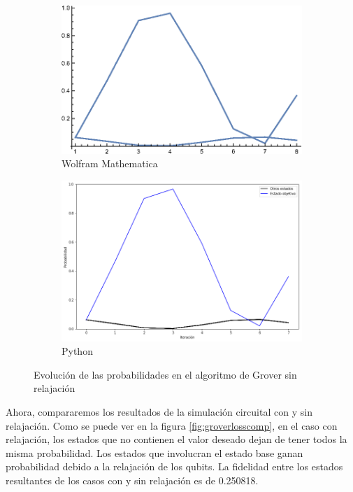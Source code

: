 \begin{figure}[H]
    \centering
    \begin{subfigure}[m]{0.49\textwidth}
        \centering
        \includegraphics[width=0.9\linewidth]{img/Grover-2_gr1.eps}
        \caption{Wolfram Mathematica}
    \end{subfigure}
    \begin{subfigure}[m]{0.49\textwidth}
        \centering
        \includegraphics[width=0.9\linewidth]{img/groveralllossless.png}
        \caption{Python}
    \end{subfigure}
    \caption[Evolución de las probabilidades en el algoritmo de Grover sin relajación]{Evolución de las probabilidades en el algoritmo de Grover sin relajación}
    \label{fig:groverlosslesscomp1111}
\end{figure}

Ahora, compararemos los resultados de la simulación circuital con y sin relajación. Como se puede ver en la figura \ref{fig:groverlosscomp}, en el caso con relajación, los estados que no contienen el valor deseado dejan de tener todos la misma probabilidad. Los estados que involucran el estado base ganan probabilidad debido a la relajación de los qubits. La fidelidad entre los estados resultantes de los casos con y sin relajación es de 0.250818.

